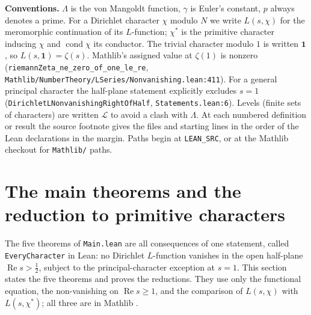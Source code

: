 \medskip\noindent\textbf{Conventions.} $\Lambda$ is the von Mangoldt function, $\gamma$ is Euler's
constant, $p$ always denotes a prime. For a Dirichlet character $\chi$ modulo $N$ we write
$L(s,\chi)$ for the meromorphic continuation of its $L$-function; $\chi^{*}$ is the primitive
character inducing $\chi$ and $\operatorname{cond}\chi$ its conductor. The trivial character modulo
$1$ is written $\mathbf 1$, so $L(s,\mathbf 1)=\zeta(s)$. Mathlib's assigned value at $\zeta(1)$ is nonzero
(\texttt{riemannZeta\_ne\_zero\_of\_one\_le\_re}, \nolinkurl{Mathlib/NumberTheory/LSeries/Nonvanishing.lean:411}).
For a general principal character the half-plane statement explicitly excludes $s=1$
(\texttt{DirichletLNonvanishingRightOfHalf}, \nolinkurl{Statements.lean:6}). Levels (finite sets of characters) are written
$\mathcal L$ to avoid a clash with $\Lambda$. At each numbered definition or result the
source footnote gives the files and starting lines in the order of the Lean declarations in the
margin. Paths begin at \texttt{LEAN\_SRC}, or at the Mathlib checkout for
\nolinkurl{Mathlib/} paths.

\section{The main theorems and the reduction to primitive characters}\label{sec:E-main}

The five theorems of \texttt{Main.lean} are all consequences of one statement, called
\texttt{EveryCharacter} in Lean: no Dirichlet $L$-function vanishes in the open half-plane
$\operatorname{Re}s>\tfrac12$, subject to the principal-character exception at $s=1$. This section states the five theorems and proves the reductions.
They use only the functional equation, the non-vanishing on $\operatorname{Re}s\ge1$, and the
comparison of $L(s,\chi)$ with $L(s,\chi^{*})$; all three are in Mathlib \cite{E-mathlib-dircont,E-mathlib-nonvanishing}.

